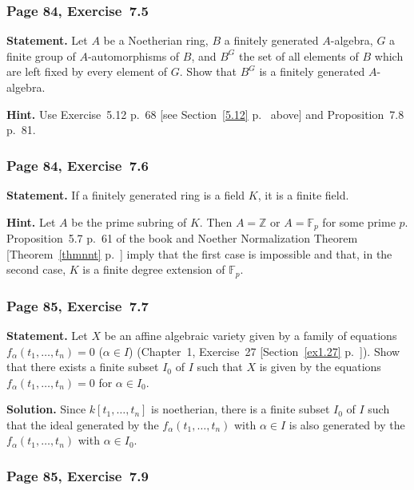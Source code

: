 \documentclass[12pt,letterpaper]{article}%
\newcommand{\nn}{\noindent}
\begin{document}
\subsubsection{Page 84, Exercise~7.5}%

\textbf{Statement.} Let $A$ be a Noetherian ring, $B$ a finitely generated $A$-algebra, $G$ a finite group of $A$-automorphisms of $B$, and $B^G$ the set of all elements of $B$ which are left fixed by every element of $G$. Show that $B^G$ is a finitely generated $A$-algebra.

\nn\textbf{Hint.} Use Exercise~5.12 p.~68 [see Section~\ref{5.12} p.~\pageref{5.12} above] and Proposition~7.8 p.~81.

\subsubsection{Page 84, Exercise~7.6}%

\textbf{Statement.} If a finitely generated ring is a field $K$, it is a finite field.

\nn\textbf{Hint.} Let $A$ be the prime subring of $K$. Then $A=\mathbb Z$ or $A=\mathbb F_p$ for some prime $p$. Proposition~5.7 p.~61 of the book and Noether Normalization Theorem [Theorem~\ref{thmnnt} p.~\pageref{thmnnt}] %
imply that the first case is impossible and that, in the second case, $K$ is a finite degree extension of $\mathbb F_p$.

\subsubsection{Page 85, Exercise~7.7}%

\textbf{Statement.} Let $X$ be an affine algebraic variety given by a family of equations $f_\alpha(t_1,\ldots,t_n)=0$ ($\alpha\in I$) (Chapter~1, Exercise~27 [Section~\ref{ex1.27} p.~\pageref{ex1.27}]). Show that there exists a finite subset $I_0$ of $I$ such that $X$ is given by the equations $f_\alpha(t_1,\ldots,t_n)=0$ for $\alpha\in I_0$.

\nn\textbf{Solution.} Since $k[t_1,\ldots,t_n]$ is noetherian, there is a finite subset $I_0$ of $I$ such that the ideal generated by the $f_\alpha(t_1,\ldots,t_n)$ with $\alpha\in I$ is also generated by the $f_\alpha(t_1,\ldots,t_n)$ with $\alpha\in I_0$. %

\subsubsection{Page 85, Exercise~7.9}%
\end{document}
